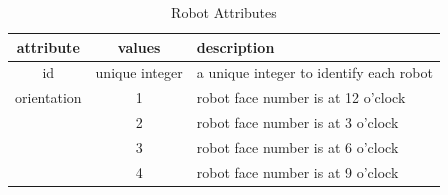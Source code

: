 \documentclass{article}
\begin{document}
\begin{table}[H]
	\begin{center}
	\begin{tabular}{c | c | l}
		\hline \hline
		\textbf{attribute} & \textbf{values} & \textbf{description} \\ \hline
		id & unique integer & a unique integer to identify each robot \\
		orientation & 1 & robot face number is at 12 o'clock \\
		 & 2 & robot face number is at 3 o'clock \\
		 & 3 & robot face number is at 6 o'clock \\
		 & 4 & robot face number is at 9 o'clock \\
		\hline \hline
	\end{tabular}
	\caption{Robot Attributes}
	\label{tab:attributes}
	\end{center}
\end{table}
\end{document}
